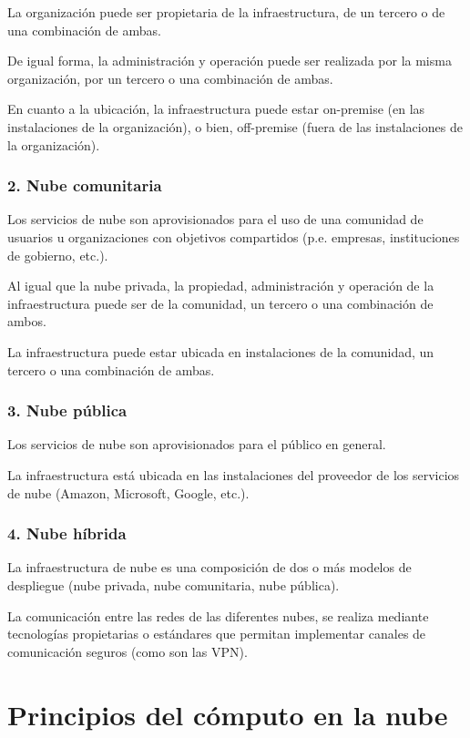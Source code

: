 \documentclass[11pt,a4paper,oneside]{book}
\begin{document}
La organización puede ser propietaria de la infraestructura, de un tercero o de una combinación de ambas.

De igual forma, la administración y operación puede ser realizada por la misma organización, por un tercero o una combinación de ambas.

En cuanto a la ubicación, la infraestructura puede estar on-premise (en las instalaciones de la organización), o bien, off-premise (fuera de las instalaciones de la organización).

\subsection{2. Nube comunitaria}

Los servicios de nube son aprovisionados para el uso de una comunidad de usuarios u organizaciones con objetivos compartidos (p.e. empresas, instituciones de gobierno, etc.).

Al igual que la nube privada, la propiedad, administración y operación de la infraestructura puede ser de la comunidad, un tercero o una combinación de ambos.

La infraestructura puede estar ubicada en instalaciones de la comunidad, un tercero o una combinación de ambas.

\subsection{3. Nube pública}

Los servicios de nube son aprovisionados para el público en general.

La infraestructura está ubicada en las instalaciones del proveedor de los servicios de nube (Amazon, Microsoft, Google, etc.).

\subsection{4. Nube híbrida}

La infraestructura de nube es una composición de dos o más modelos de despliegue (nube privada, nube comunitaria, nube pública).

La comunicación entre las redes de las diferentes nubes, se realiza mediante tecnologías propietarias o estándares que permitan implementar canales de comunicación seguros (como son las VPN).

\chapter{Principios del cómputo en la nube}
\end{document}
